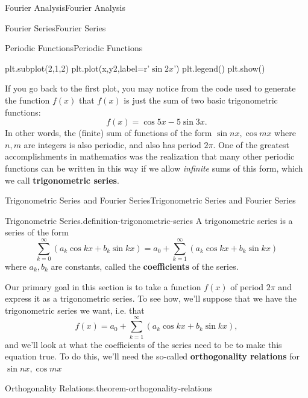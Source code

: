\documentclass[10pt,]{book}
\newcommand{\terminology}[1]{\textbf{#1}}
\numberwithin{equation}{section}
\begin{document}
\begin{chapterptx}{Fourier Analysis}{}{Fourier Analysis}{}{}
\begin{sectionptx}{Fourier Series}{}{Fourier Series}{}{}
\begin{subsectionptx}{Periodic Functions}{}{Periodic Functions}{}{}
\begin{sageinput}
plt.subplot(2,1,2)
plt.plot(x,y2,label=r'$\sin2x$')
plt.legend()
plt.show()
\end{sageinput}
\hypertarget{p-382}{}%
If you go back to the first plot, you may notice from the code used to generate the function \(f(x)\) that \(f(x)\) is just the sum of two basic trigonometric functions:%
\begin{equation*}
f(x) = \cos5x-5\sin3x.
\end{equation*}
In other words, the (finite) sum of functions of the form \(\sin nx,\cos mx\) where \(n,m\) are integers is also periodic, and also has period \(2\pi\). One of the greatest accomplishments in mathematics was the realization that many other periodic functions can be written in this way if we allow \emph{infinite} sums of this form, which we call \terminology{trigonometric series}.%
\end{subsectionptx}
%
%
\typeout{************************************************}
\typeout{************************************************}
%
\begin{subsectionptx}{Trigonometric Series and Fourier Series}{}{Trigonometric Series and Fourier Series}{}{}\label{subsection-trig-and-fourier-series}
\begin{definition}{Trigonometric Series.}{definition-trigonometric-series}%
\hypertarget{p-383}{}%
A trigonometric series is a series of the form%
\begin{equation*}
\sum_{k=0}^{\infty}(a_{k}\cos kx+b_{k}\sin kx) = a_{0} + \sum_{k=1}^{\infty}(a_{k}\cos kx+b_{k}\sin kx)
\end{equation*}
where \(a_{k},b_{k}\) are constants, called the \terminology{coefficients} of the series.%
\end{definition}
\hypertarget{p-384}{}%
Our primary goal in this section is to take a function \(f(x)\) of period \(2\pi\) and express it as a trigonometric series. To see how, we'll suppose that we have the trigonometric series we want, i.e. that%
\begin{equation*}
f(x) = a_{0} + \sum_{k=1}^{\infty}(a_{k}\cos kx+b_{k}\sin kx),
\end{equation*}
and we'll look at what the coefficients of the series need to be to make this equation true. To do this, we'll need the so-called \terminology{orthogonality relations} for \(\sin nx,\cos mx\)%
\begin{theorem}{Orthogonality Relations.}{}{theorem-orthogonality-relations}%
\hypertarget{p-385}{}%

\end{theorem}
\end{subsectionptx}
\end{sectionptx}
\end{chapterptx}
\end{document}
